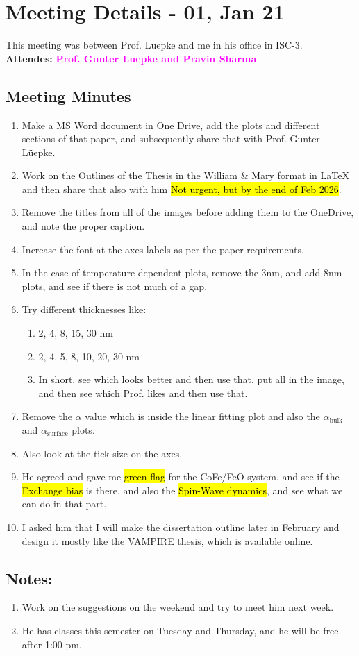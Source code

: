 \section{Meeting Details - 01, Jan 21}
\label{chap:Meeting_01}
This meeting was between Prof. Luepke and me in his office in ISC-3.\\ \textbf{Attendes:}
\textcolor{magenta}{\textbf{Prof. Gunter Luepke and Pravin Sharma}}
\subsection*{Meeting Minutes}
\begin{enumerate}[\ding{212}]  %
    \item Make a MS Word document in One Drive, add the plots and different sections of that paper, and subsequently share that with Prof. Gunter Lüepke. 
    \item Work on the Outlines of the Thesis in the William \& Mary format in {LaTeX} and then share that also with him \hl{Not urgent, but by the end of Feb 2026}.
    \item Remove the titles from all of the images before adding them to the OneDrive, and note the proper caption. \cmark 
    \item Increase the font at the axes labels as per the paper requirements. \cmark
    \item In the case of temperature-dependent plots, remove the 3nm, and add 8nm plots, and see if there is not much of a gap. \cmark
    \item Try different thicknesses like: \cmark
    \begin{enumerate} [\ding{226}]
        \item 2, 4, 8, 15, 30 nm
        \item 2, 4, 5, 8, 10, 20, 30 nm
        \item In short, see which looks better and then use that, put all in the image, and then see which Prof. likes and then use that. \cmark
    \end{enumerate}
    \item Remove the $\alpha$ value which is inside the linear fitting plot and also the $\alpha_{\mathrm{bulk}}$ and $\alpha_{\mathrm{surface}}$ plots.
    \item Also look at the tick size on the axes. \cmark
    \item He agreed and gave me \textcolor{red}{\hl{green flag}} for the CoFe/FeO system, and see if the \hl{Exchange bias} is there, and also the \hl{Spin-Wave dynamics}, and see what we can do in that part.\xmark
    \item I asked him that I will make the dissertation outline later in February and design it mostly like the VAMPIRE thesis, which is available online. \xmark
\end{enumerate}
\subsection*{Notes:}
\begin{enumerate}
    \item Work on the suggestions on the weekend and try to meet him next week. 
    \item He has classes this semester on Tuesday and Thursday, and he will be free after 1:00 pm.
\end{enumerate}